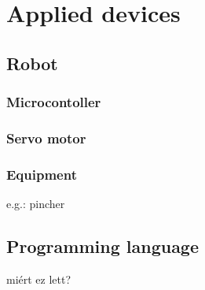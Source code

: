 
\chapter{Applied devices}

\section{Robot}

	\subsection{Microcontoller}

	\subsection{Servo motor}

	\subsection{Equipment}
	e.g.: pincher


\section{Programming language}

miért ez lett?